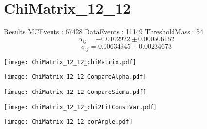\documentclass[a4paper,12pt]{article}
\begin{document}
\section{ChiMatrix\_12\_12}
\begin{minipage}{0.49\linewidth} Results \newline
MCEvents : 67428\newline
DataEvents : 11149 \newline
ThresholdMass : 54\\
$$\alpha_{ij} = -0.0102922\pm 0.000506152$$
$$\sigma_{ij} = 0.00634945\pm 0.00234673$$
\end{minipage}\hfill
\begin{minipage}{0.49\linewidth} 
\texttt{[image: ChiMatrix\_12\_12\_chiMatrix.pdf]}\\
\end{minipage}
\hfill
\begin{minipage}{0.49\linewidth} 
\texttt{[image: ChiMatrix\_12\_12\_CompareAlpha.pdf]}\\
\end{minipage}
\hfill
\begin{minipage}{0.49\linewidth} 
\texttt{[image: ChiMatrix\_12\_12\_CompareSigma.pdf]}\\
\end{minipage}
\begin{minipage}{0.49\linewidth} 
\texttt{[image: ChiMatrix\_12\_12\_chi2FitConstVar.pdf]}\\
\end{minipage}
\hfill
\begin{minipage}{0.49\linewidth} 
\texttt{[image: ChiMatrix\_12\_12\_corAngle.pdf]}\\
\end{minipage}
\end{document}
